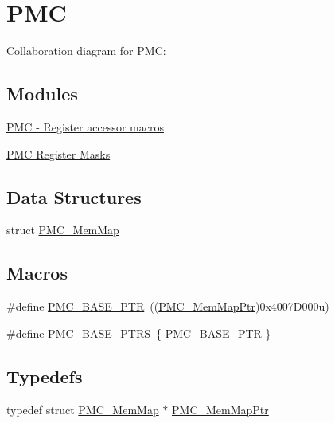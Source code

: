\hypertarget{group___p_m_c___peripheral}{}\section{P\+MC}
\label{group___p_m_c___peripheral}
Collaboration diagram for P\+MC\+:
\subsection*{Modules}
\begin{DoxyCompactItemize}
\item 
\hyperlink{group___p_m_c___register___accessor___macros}{P\+M\+C -\/ Register accessor macros}
\item 
\hyperlink{group___p_m_c___register___masks}{P\+M\+C Register Masks}
\end{DoxyCompactItemize}
\subsection*{Data Structures}
\begin{DoxyCompactItemize}
\item 
struct \hyperlink{struct_p_m_c___mem_map}{P\+M\+C\+\_\+\+Mem\+Map}
\end{DoxyCompactItemize}
\subsection*{Macros}
\begin{DoxyCompactItemize}
\item 
\#define \hyperlink{group___p_m_c___peripheral_gaf32df9f1096263f10a5e8978a338b2ac}{P\+M\+C\+\_\+\+B\+A\+S\+E\+\_\+\+P\+TR}~((\hyperlink{group___p_m_c___peripheral_ga0e73f22a2fa26cbb012851719e34812e}{P\+M\+C\+\_\+\+Mem\+Map\+Ptr})0x4007\+D000u)
\item 
\#define \hyperlink{group___p_m_c___peripheral_ga4bcd62643d597f7230f9c1e3d03caaa7}{P\+M\+C\+\_\+\+B\+A\+S\+E\+\_\+\+P\+T\+RS}~\{ \hyperlink{group___p_m_c___peripheral_gaf32df9f1096263f10a5e8978a338b2ac}{P\+M\+C\+\_\+\+B\+A\+S\+E\+\_\+\+P\+TR} \}
\end{DoxyCompactItemize}
\subsection*{Typedefs}
\begin{DoxyCompactItemize}
\item 
typedef struct \hyperlink{struct_p_m_c___mem_map}{P\+M\+C\+\_\+\+Mem\+Map} $\ast$ \hyperlink{group___p_m_c___peripheral_ga0e73f22a2fa26cbb012851719e34812e}{P\+M\+C\+\_\+\+Mem\+Map\+Ptr}
\end{DoxyCompactItemize}


